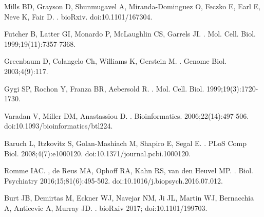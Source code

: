 \documentclass[10pt,letterpaper]{article}
\begin{document}
{\begin{thebibliography}{100}
Mills BD, Grayson D, Shunmugavel A, Miranda-Dominguez O, Feczko E, Earl E, Neve K, Fair D.
.
\newblock bioRxiv.
\newblock doi:{10.1101/167304}.

Futcher B, Latter GI, Monardo P, McLaughlin CS, Garrels JI.
.
\newblock Mol. Cell. Biol. 1999;19(11):7357-7368.

Greenbaum D, Colangelo Ch, Williams K, Gerstein M.
.
\newblock Genome Biol. 2003;4(9):117.

Gygi SP, Rochon Y, Franza BR, Aebersold R.
.
\newblock Mol. Cell. Biol. 1999;19(3):1720-1730.

Varadan V, Miller DM, Anastassiou D.
.
\newblock Bioinformatics. 2006;22(14):497-506.
\newblock doi:{10.1093/bioinformatics/btl224}.

Baruch L, Itzkovitz S, Golan-Mashiach M, Shapiro E, Segal E.
.
\newblock PLoS Comp Biol. 2008;4(7):e1000120.
\newblock doi:{10.1371/journal.pcbi.1000120}.

Romme IAC. , de Reus MA, Ophoff RA, Kahn RS, van den Heuvel MP.
.
\newblock Biol. Psychiatry 2016;15;81(6):495-502.
\newblock doi:{10.1016/j.biopsych.2016.07.012}.

Burt JB, Demirtas M, Eckner WJ, Navejar NM, Ji JL, Martin WJ, Bernacchia A, Anticevic A, Murray JD.
.
\newblock bioRxiv 2017;
\newblock doi:{10.1101/199703}.

\end{thebibliography}


}
\end{document}

